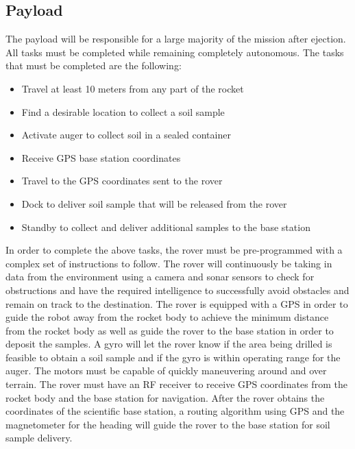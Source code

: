 \documentclass[onecolumn, draftclsnofoot, 10pt, compsoc]{IEEEtran}
\begin{document}
\newpage
\clearpage

\subsection{Payload}
The payload will be responsible for a large majority of the mission after ejection. All tasks must be completed while remaining completely autonomous. The tasks that must be completed are the following:

\begin{itemize}
    \item Travel at least 10 meters from any part of the rocket
    \item Find a desirable location to collect a soil sample
    \item Activate auger to collect soil in a sealed container
    \item Receive GPS base station coordinates
    \item Travel to the GPS coordinates sent to the rover
    \item Dock to deliver soil sample that will be released from the rover
    \item Standby to collect and deliver additional samples to the base station
\end{itemize}

\setlength{\parindent}{0cm}
In order to complete the above tasks, the rover must be pre-programmed with a complex set of instructions to follow. The rover will continuously be taking in data from the environment using a camera and sonar sensors to check for obstructions and have the required intelligence to successfully avoid obstacles and remain on track to the destination. The rover is equipped with a GPS in order to guide the robot away from the rocket body to achieve the minimum distance from the rocket body as well as guide the rover to the base station in order to deposit the samples. A gyro will let the rover know if the area being drilled is feasible to obtain a soil sample and if the gyro is within operating range for the auger. The motors must be capable of quickly maneuvering around and over terrain. The rover must have an RF receiver to receive GPS coordinates from the rocket body and the base station for navigation. After the rover obtains the coordinates of the scientific base station, a routing algorithm using GPS and the magnetometer for the heading will guide the rover to the base station for soil sample delivery. 
\end{document}
